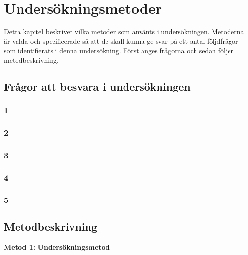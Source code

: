 \documentclass[conference]{IEEEtran}
\begin{document}
\section{Undersökningsmetoder}
Detta kapitel beskriver vilka metoder som använts i undersökningen. Metoderna är valda och specificerade så att de skall kunna ge svar på ett antal följdfrågor som identifierats i denna undersökning. Först anges frågorna och sedan följer metodbeskrivning.
\subsection{Frågor att besvara i undersökningen}

\subsubsection{1}
\subsubsection{2}
\subsubsection{3}
\subsubsection{4}
\subsubsection{5}

\subsection{Metodbeskrivning}

\textbf{Metod 1: Undersökningsmetod}
\end{document}
